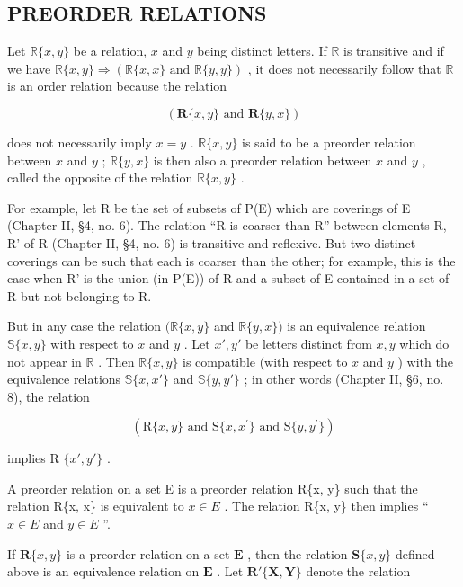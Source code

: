 \subsection{PREORDER RELATIONS}

Let \(\mathbb{R}\{x, y\}\) be a relation, \(x\) and \(y\) being distinct letters. If \(\mathbb{R}\) is transitive and if we have \(\mathbb{R}\{x, y\} \Longrightarrow (\mathbb{R}\{x, x\} \text{ and } \mathbb{R}\{y, y\})\) , it does not necessarily follow that \(\mathbb{R}\) is an order relation because the relation

\[
(\mathbf {R} \{x, y \} \text { and } \mathbf {R} \{y, x \})
\]

does not necessarily imply \(x = y\) . \(\mathbb{R}\{x, y\}\) is said to be a preorder relation between \(x\) and \(y\) ; \(\mathbb{R}\{y, x\}\) is then also a preorder relation between \(x\) and \(y\) , called the opposite of the relation \(\mathbb{R}\{x, y\}\) .

For example, let R be the set of subsets of P(E) which are coverings of E (Chapter II, §4, no. 6). The relation ``R is coarser than R'' between elements R, R' of R (Chapter II, §4, no. 6) is transitive and reflexive. But two distinct coverings can be such that each is coarser than the other; for example, this is the case when R' is the union (in P(E)) of R and a subset of E contained in a set of R but not belonging to R.

But in any case the relation \((\mathbb{R}\{x, y\}\) and \(\mathbb{R}\{y, x\})\) is an equivalence relation \(\mathbb{S}\{x, y\}\) with respect to \(x\) and \(y\) . Let \(x', y'\) be letters distinct from \(x, y\) which do not appear in \(\mathbb{R}\) . Then \(\mathbb{R}\{x, y\}\) is compatible (with respect to \(x\) and \(y\) ) with the equivalence relations \(\mathbb{S}\{x, x'\}\) and \(\mathbb{S}\{y, y'\}\) ; in other words (Chapter II, §6, no. 8), the relation

\[
(\mathrm{R} \{x, y \} \text {   and   } \mathrm{S} \{x, x ^ {\prime} \} \text {   and   } \mathrm{S} \{y, y ^ {\prime} \})
\]

implies R \(\{x', y'\}\) .

A preorder relation on a set E is a preorder relation R\{x, y\} such that the relation R\{x, x\} is equivalent to \(x \in E\) . The relation R\{x, y\} then implies `` \(x \in E\) and \(y \in E\) ''.

If \(\mathbf{R}\{x, y\}\) is a preorder relation on a set \(\mathbf{E}\) , then the relation \(\mathbf{S}\{x, y\}\) defined above is an equivalence relation on \(\mathbf{E}\) . Let \(\mathbf{R}'\{\mathbf{X}, \mathbf{Y}\}\) denote the relation


